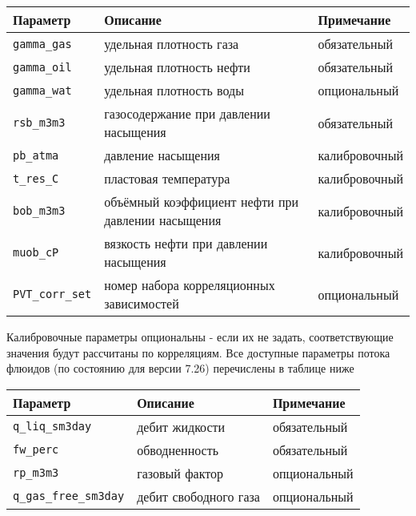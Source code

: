 \begin{center}
	\begin{tabular}{ |m{8em}|m{15em}|m{7.5em}| } 
		\hline
		Параметр & Описание & Примечание \\ 
		\hline
		\texttt{gamma_gas} & удельная плотность газа & обязательный \\ 
		\texttt{gamma_oil} & удельная плотность нефти & обязательный \\ 
		\texttt{gamma_wat} & удельная плотность воды & опциональный \\ 
		\texttt{rsb_m3m3} & газосодержание при давлении насыщения & обязательный \\ 
		\hline
		\texttt{pb_atma} & давление насыщения & калибровочный\\ 
		\texttt{t_res_C} & пластовая температура & калибровочный\\ 
		\texttt{bob_m3m3} & объёмный коэффициент нефти при давлении насыщения & калибровочный\\
		\texttt{muob_cP} & вязкость нефти при давлении насыщения & калибровочный \\
		\hline
		\texttt{PVT_corr_set} & номер набора корреляционных зависимостей & опциональный \\
		\hline
	\end{tabular}
\end{center}

Калибровочные параметры опциональны - если их не задать, соответствующие значения будут рассчитаны по корреляциям.
Все доступные параметры потока флюидов (по состоянию для версии 7.26) перечислены в таблице ниже

\begin{center}
	\begin{tabular}{  |m{11em}|m{12em}|m{7.5em}| } 
		\hline
		Параметр & Описание & Примечание \\ 
		\hline
		\texttt{q_liq_sm3day} & дебит жидкости & обязательный \\ 
		\texttt{fw_perc} & обводненность & обязательный \\ 
		\texttt{rp_m3m3} & газовый фактор & опциональный \\ 
		\texttt{q_gas_free_sm3day} & дебит свободного газа & опциональный \\ 
		\hline
	\end{tabular}
\end{center}

